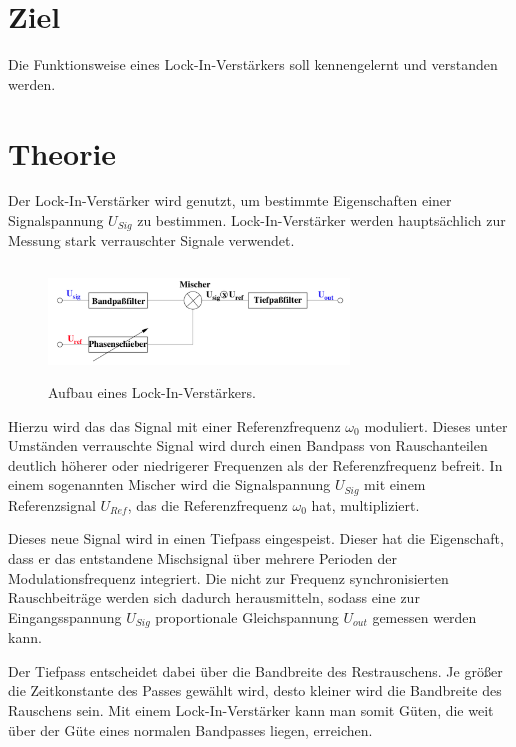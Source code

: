 \section{Ziel}
\label{sec:Ziel}

Die Funktionsweise eines Lock-In-Verstärkers soll kennengelernt und verstanden werden.%

\section{Theorie}
\label{sec:Theorie}

Der Lock-In-Verstärker wird genutzt, um bestimmte Eigenschaften einer Signalspannung 
$U_{Sig}$ zu bestimmen. Lock-In-Verstärker werden hauptsächlich zur Messung stark
verrauschter Signale verwendet.

\begin{figure}
    \centering
    \includegraphics[width=8cm, height=3cm]{build/lockin1.png}
    \caption{Aufbau eines Lock-In-Verstärkers.}
\end{figure}

\noindent Hierzu wird das das Signal mit einer Referenzfrequenz $\omega_0$ moduliert.
Dieses unter Umständen verrauschte Signal wird durch einen Bandpass von Rauschanteilen 
deutlich höherer oder niedrigerer Frequenzen als der Referenzfrequenz befreit.
In einem sogenannten Mischer wird die Signalspannung $U_{Sig}$ mit einem Referenzsignal 
$U_{Ref}$, das die Referenzfrequenz $\omega_0$ hat, multipliziert. 

\noindent Dieses neue Signal wird in einen Tiefpass eingespeist. Dieser hat die 
Eigenschaft, dass er das entstandene Mischsignal über mehrere Perioden der 
Modulationsfrequenz integriert.
Die nicht zur Frequenz synchronisierten Rauschbeiträge werden sich dadurch 
herausmitteln, sodass eine zur Eingangsspannung $U_{Sig}$ proportionale Gleichspannung 
$U_{out}$ gemessen werden kann. 

\noindent Der Tiefpass entscheidet dabei über die Bandbreite des Restrauschens. 
Je größer die Zeitkonstante des Passes gewählt wird, desto kleiner wird die Bandbreite 
des Rauschens sein. Mit einem Lock-In-Verstärker kann man somit Güten, 
die weit über der Güte eines normalen Bandpasses liegen, erreichen.

